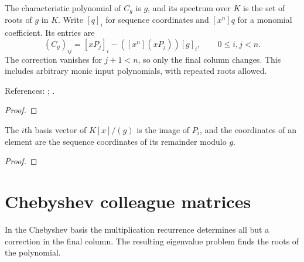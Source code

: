 \begin{theorem}
\label{thm:comrade-matrix}
\leanok
The characteristic polynomial of $C_g$ is $g$, and its spectrum over $K$ is the
set of roots of $g$ in $K$. Write $[q]_i$ for sequence coordinates and $[x^n]q$
for a monomial coefficient. Its entries are
\[
 (C_g)_{ij}=[xP_j]_i-([x^n](xP_j))[g]_i,\qquad 0\le i,j<n.
\]
The correction vanishes for $j+1<n$, so only the final column changes.
This includes arbitrary monic input polynomials, with repeated roots allowed.

References: \cite{barnett-comrade}; \cite[Chapter 18]{atap}.
\end{theorem}
\begin{proof}
\leanok
\end{proof}

\begin{supporting}

\begin{theorem}
\label{thm:comrade-basis}
\leanok
The $i$th basis vector of $K[x]/(g)$ is the image of $P_i$, and the
coordinates of an element are the sequence coordinates of its remainder
modulo $g$.
\end{theorem}
\begin{proof}
\leanok
\end{proof}

\end{supporting}

\section{Chebyshev colleague matrices}\label{sec:textbook-roots-colleague}

In the Chebyshev basis the multiplication recurrence determines all but a correction in the final column. The resulting eigenvalue problem finds the roots of the polynomial.

